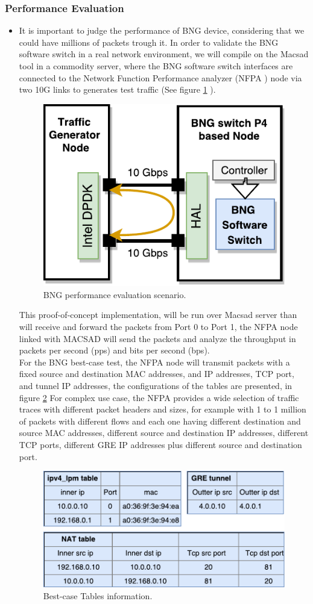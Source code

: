 \subsubsection{Performance Evaluation}
\begin{itemize}
	\item It is important to judge the performance of  \acrshort{BNG} device, considering that we could have millions of packets trough it. 
	In order to validate the BNG software switch in a real network environment, we will compile on the Macsad tool in a commodity server, where the BNG software switch interfaces are connected to the Network Function Performance analyzer (NFPA \cite{nfpa}) node  via two 10G links to generates test traffic (See figure \ref{fig:bng_perf} ).
	
	
	\begin{figure}[ht]
		\centering
		\includegraphics[width=0.35\linewidth] 
		{figures/bng_perf.pdf}
		\caption{BNG performance evaluation scenario.}
		\label{fig:bng_perf}
	\end{figure}
	
	This proof-of-concept implementation, will be run over Macsad server than will receive and forward the packets from Port 0 to Port 1, the NFPA node linked with MACSAD will send the packets and analyze the throughput in packets per second (pps) and bits per second (bps).\\
	
	For the BNG best-case test, the NFPA node will transmit packets with a fixed source and destination MAC addresses, and IP addresses, TCP port, and tunnel IP addresses, the configurations of the tables are presented,   in figure \ref{fig:bng_tables}
	For complex use case, the NFPA provides a wide selection of traffic traces with different packet headers and sizes,  for example with 1 to 1 million of packets with different flows and each one having different destination and source MAC addresses, different source and destination IP addresses, different TCP ports, different GRE IP addresses plus
	different source and destination port.
	
	\begin{figure}[ht]
		\centering
		\includegraphics[width=0.6\linewidth] 
		{figures/bng_tables.pdf}
		\caption{Best-case Tables information.}
		\label{fig:bng_tables}
	\end{figure}
	
	
	
\end{itemize}
